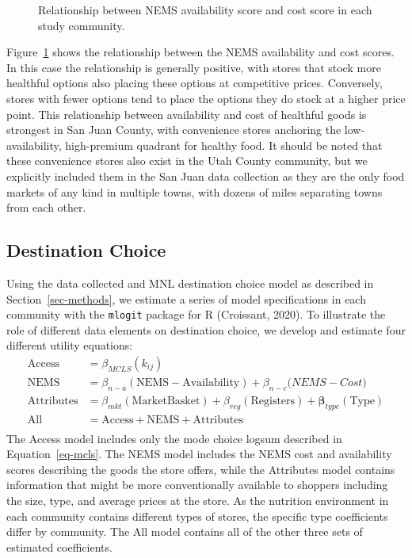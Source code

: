 \documentclass[
  letterpaper,
  number,
  review,
  3p]{elsarticle}
\begin{document}
\begin{figure}


\caption{\label{fig-nems-cost-avail}Relationship between NEMS
availability score and cost score in each study community.}

\end{figure}%

Figure~\ref{fig-nems-cost-avail} shows the relationship between the NEMS
availability and cost scores. In this case the relationship is generally
positive, with stores that stock more healthful options also placing
these options at competitive prices. Conversely, stores with fewer
options tend to place the options they do stock at a higher price point.
This relationship between availability and cost of healthful goods is
strongest in San Juan County, with convenience stores anchoring the
low-availability, high-premium quadrant for healthy food. It should be
noted that these convenience stores also exist in the Utah County
community, but we explicitly included them in the San Juan data
collection as they are the only food markets of any kind in multiple
towns, with dozens of miles separating towns from each other.

\subsection{Destination Choice}\label{sec-estimation}

Using the data collected and MNL destination choice model as described
in Section~\ref{sec-methods}, we estimate a series of model
specifications in each community with the \texttt{mlogit} package for R
(Croissant, 2020). To illustrate the role of different data elements on
destination choice, we develop and estimate four different utility
equations: \begin{align*}
\mathrm{Access} &= \beta_{MCLS}( k_{ij})\\
\mathrm{NEMS} &= \beta_{n-a} (\mathrm{NEMS-Availability}) + \beta_{n-c}\mathrm({NEMS-Cost})\\
\mathrm{Attributes} &= \beta_{mkt} (\mathrm{Market Basket}) + \beta_{reg} (\mathrm{Registers}) + \mathbf{\beta}_{type}(\mathrm{Type})\\
\mathrm{All} &= \mathrm{Access} + \mathrm{NEMS} + \mathrm{Attributes}\\
\end{align*} The Access model includes only the mode choice logsum
described in Equation~\ref{eq-mcls}. The NEMS model includes the NEMS
cost and availability scores describing the goods the store offers,
while the Attributes model contains information that might be more
conventionally available to shoppers including the size, type, and
average prices at the store. As the nutrition environment in each
community contains different types of stores, the specific type
coefficients differ by community. The All model contains all of the
other three sets of estimated coefficients.
\end{document}
